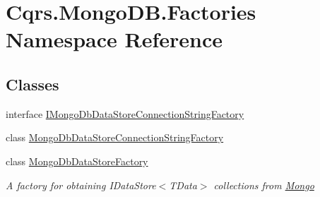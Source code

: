 \hypertarget{namespaceCqrs_1_1MongoDB_1_1Factories}{}\section{Cqrs.\+Mongo\+D\+B.\+Factories Namespace Reference}
\label{namespaceCqrs_1_1MongoDB_1_1Factories}
\subsection*{Classes}
\begin{DoxyCompactItemize}
\item 
interface \hyperlink{interfaceCqrs_1_1MongoDB_1_1Factories_1_1IMongoDbDataStoreConnectionStringFactory}{I\+Mongo\+Db\+Data\+Store\+Connection\+String\+Factory}
\item 
class \hyperlink{classCqrs_1_1MongoDB_1_1Factories_1_1MongoDbDataStoreConnectionStringFactory}{Mongo\+Db\+Data\+Store\+Connection\+String\+Factory}
\item 
class \hyperlink{classCqrs_1_1MongoDB_1_1Factories_1_1MongoDbDataStoreFactory}{Mongo\+Db\+Data\+Store\+Factory}
\begin{DoxyCompactList}\small\item\em A factory for obtaining I\+Data\+Store$<$\+T\+Data$>$ collections from \hyperlink{namespaceCqrs_1_1Mongo}{Mongo} \end{DoxyCompactList}\end{DoxyCompactItemize}
